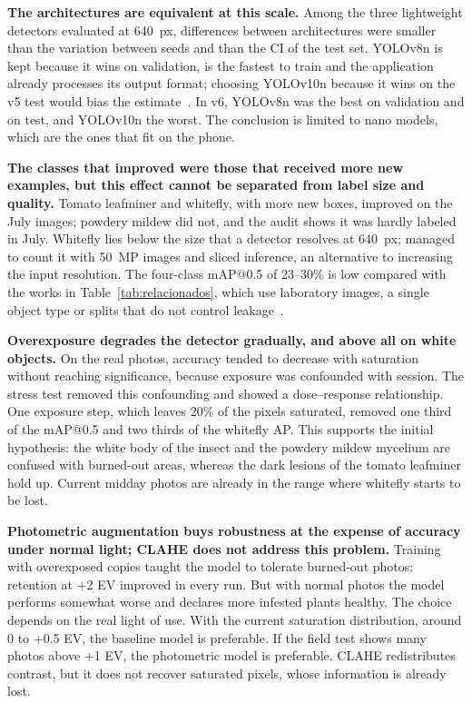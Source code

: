 \documentclass[sensors,article,submit,pdftex,moreauthors]{Definitions/mdpi}
\begin{document}
{\color{blue} \textbf{The architectures are equivalent at this scale.} Among the three lightweight detectors evaluated at 640~px, differences between architectures were smaller than the variation between seeds and than the CI of the test set.} {\color{blue} YOLOv8n is kept because it wins on validation, is the fastest to train and the application already processes its output format; choosing YOLOv10n because it wins on the v5 test would bias the estimate~\cite{Kapoor2023}.} {\color{blue} In v6, YOLOv8n was the best on validation and on test, and YOLOv10n the worst.} {\color{blue} The conclusion is limited to nano models, which are the ones that fit on the phone.}

{\color{blue} \textbf{The classes that improved were those that received more new examples, but this effect cannot be separated from label size and quality.} Tomato leafminer and whitefly, with more new boxes, improved on the July images; powdery mildew did not, and the audit shows it was hardly labeled in July.} {\color{blue} Whitefly lies below the size that a detector resolves at 640~px;} {\color{blue} \citet{Zhao2025} managed to count it with 50~MP images and sliced inference, an alternative to increasing the input resolution.} {\color{blue} The four-class mAP@0.5 of 23--30\% is low compared with the works in Table~\ref{tab:relacionados}, which use laboratory images, a single object type or splits that do not control leakage~\cite{Gerz2025}.}

{\color{blue} \textbf{Overexposure degrades the detector gradually, and above all on white objects.} On the real photos, accuracy tended to decrease with saturation without reaching significance, because exposure was confounded with session.} {\color{blue} The stress test removed this confounding and showed a dose--response relationship.} {\color{blue} One exposure step, which leaves 20\% of the pixels saturated, removed one third of the mAP@0.5 and two thirds of the whitefly AP.} {\color{blue} This supports the initial hypothesis: the white body of the insect and the powdery mildew mycelium are confused with burned-out areas, whereas the dark lesions of the tomato leafminer hold up.} {\color{blue} Current midday photos are already in the range where whitefly starts to be lost.}

{\color{blue} \textbf{Photometric augmentation buys robustness at the expense of accuracy under normal light; CLAHE does not address this problem.} Training with overexposed copies taught the model to tolerate burned-out photos: retention at +2 EV improved in every run.} {\color{blue} But with normal photos the model performs somewhat worse and declares more infested plants healthy.} {\color{blue} The choice depends on the real light of use.} {\color{blue} With the current saturation distribution, around 0 to +0.5 EV, the baseline model is preferable.} {\color{blue} If the field test shows many photos above +1 EV, the photometric model is preferable.} {\color{blue} CLAHE redistributes contrast, but it does not recover saturated pixels, whose information is already lost.}
\end{document}
